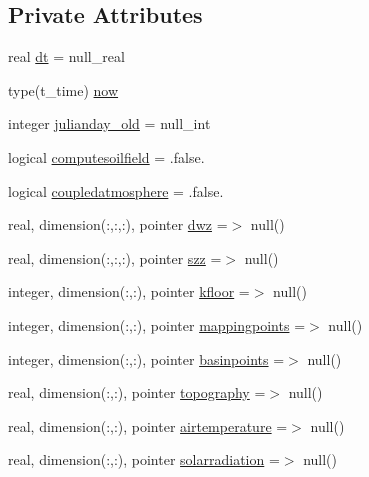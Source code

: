 \subsection*{Private Attributes}
\begin{DoxyCompactItemize}
\item 
real \mbox{\hyperlink{structmodulevegetation_1_1t__external_a2cc9a47c6aab7954e497f04ada6f33b7}{dt}} = null\+\_\+real
\item 
type(t\+\_\+time) \mbox{\hyperlink{structmodulevegetation_1_1t__external_accf48d8579d4504d5464c7ea166d27d5}{now}}
\item 
integer \mbox{\hyperlink{structmodulevegetation_1_1t__external_a70cd16b3fdd3ed7136193eb210642a0d}{julianday\+\_\+old}} = null\+\_\+int
\item 
logical \mbox{\hyperlink{structmodulevegetation_1_1t__external_a994ac1f7a96cdf43dc236f2b440b2291}{computesoilfield}} = .false.
\item 
logical \mbox{\hyperlink{structmodulevegetation_1_1t__external_af47bf3697f38becd60ffa7942f20c7de}{coupledatmosphere}} = .false.
\item 
real, dimension(\+:,\+:,\+:), pointer \mbox{\hyperlink{structmodulevegetation_1_1t__external_ad1f96193f15e0e997c4af139f40dff90}{dwz}} =$>$ null()
\item 
real, dimension(\+:,\+:,\+:), pointer \mbox{\hyperlink{structmodulevegetation_1_1t__external_a3530158a5cf70bbb54e87a1621dbf067}{szz}} =$>$ null()
\item 
integer, dimension(\+:,\+:), pointer \mbox{\hyperlink{structmodulevegetation_1_1t__external_a30220869f4ef67e195444b8623c18598}{kfloor}} =$>$ null()
\item 
integer, dimension(\+:,\+:), pointer \mbox{\hyperlink{structmodulevegetation_1_1t__external_a8a629e51c5f136afe669a4815322d0e5}{mappingpoints}} =$>$ null()
\item 
integer, dimension(\+:,\+:), pointer \mbox{\hyperlink{structmodulevegetation_1_1t__external_acef7a312fb5148827a3375863a957eb6}{basinpoints}} =$>$ null()
\item 
real, dimension(\+:,\+:), pointer \mbox{\hyperlink{structmodulevegetation_1_1t__external_af604abe2a7f60017772e6f1346ebd97f}{topography}} =$>$ null()
\item 
real, dimension(\+:,\+:), pointer \mbox{\hyperlink{structmodulevegetation_1_1t__external_a725247f2c544683f55e90ebe4198a5f3}{airtemperature}} =$>$ null()
\item 
real, dimension(\+:,\+:), pointer \mbox{\hyperlink{structmodulevegetation_1_1t__external_af5e65e5ef47acb12b3e7c9ae0b28ed26}{solarradiation}} =$>$ null()

\end{DoxyCompactItemize}
